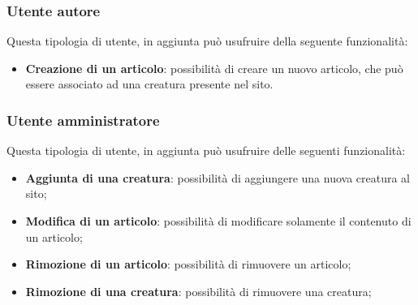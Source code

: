 \subsubsection{Utente autore}
Questa tipologia di utente, in aggiunta può usufruire della seguente funzionalità:
\begin{itemize}
    \item \textbf{Creazione di un articolo}: possibilità di creare un nuovo articolo, che può essere associato ad una creatura presente nel sito.
\end{itemize}

\subsubsection{Utente amministratore}
Questa tipologia di utente, in aggiunta può usufruire delle seguenti funzionalità:
\begin{itemize}
    \item \textbf{Aggiunta di una creatura}: possibilità di aggiungere una nuova creatura al sito;
    \item \textbf{Modifica di un articolo}: possibilità di modificare solamente il contenuto di un articolo;
    \item \textbf{Rimozione di un articolo}: possibilità di rimuovere un articolo;
    \item \textbf{Rimozione di una creatura}: possibilità di rimuovere una creatura;
\end{itemize}
